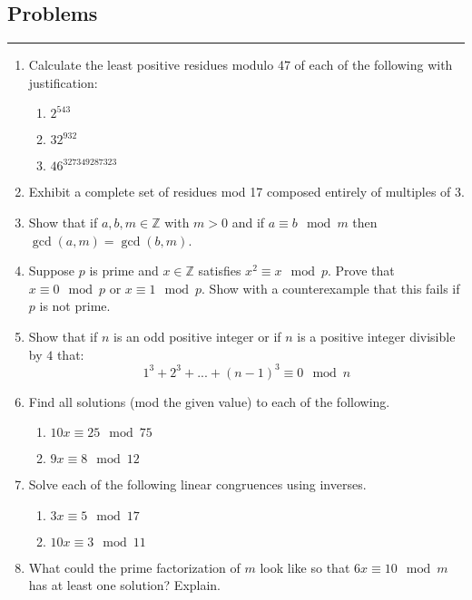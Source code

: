 \documentclass[class=article, crop=false]{standalone}
\def\integers{{\mathbb Z}}
\begin{document}
\subsection{Problems}
\rule{\textwidth}{1pt}
\begin{enumerate}
\item
  Calculate the least positive residues modulo 47 of each of
  the following with justification:
  \begin{enumerate}
  \item $2^{543}$
  \item $32^{932}$
  \item $46^{327349287323}$
  \end{enumerate}

\item
  Exhibit a complete set of residues mod 17 composed entirely of
  multiples of 3.

\item
  Show that if $a,b,m\in\integers$ with $m>0$ and if
  $a\equiv b\mod m$ then $\gcd(a,m)=\gcd(b,m)$.

\item
  Suppose $p$ is prime and $x\in\integers$ satisfies
  $x^2\equiv x\mod p$.  Prove that $x\equiv 0\mod p$ or $x\equiv 1\mod p$.
  Show with a counterexample that this fails if $p$ is not prime.

\item
  Show that if $n$ is an odd positive integer or if $n$ is a positive
  integer divisible by $4$ that:
  $$1^3+2^3+...+(n-1)^3\equiv 0\mod n$$

\item
  Find all solutions (mod the given value) to each of the following.
  \begin{enumerate}
  \item $10x \equiv 25\mod 75$
  \item $9x \equiv 8\mod 12$
  \end{enumerate}

\item
  Solve each of the following linear congruences using inverses.
  \begin{enumerate}
  \item $3x \equiv 5\mod 17$
  \item $10x \equiv 3\mod 11$
  \end{enumerate}

\item
  What could the prime factorization of $m$ look like so that
  $6x\equiv 10\mod m$ has at least one solution?  Explain.


\end{enumerate}
\end{document}
